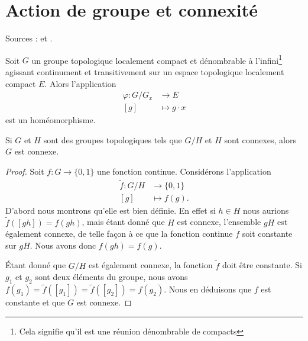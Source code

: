 \section{Action de groupe et connexité}

Sources : \cite{MneimneLie} et .

\begin{theorem}     \label{ThojrLKZk}
    Soit \( G\) un groupe topologique localement compact et dénombrable à l'infini\footnote{Cela signifie qu'il est une réunion dénombrable de compacts} agissant continument et transitivement sur un espace topologique localement compact \( E\). Alors l'application
    \begin{equation}
        \begin{aligned}
            \varphi\colon G/G_x&\to E \\
            [g]&\mapsto g\cdot x 
        \end{aligned}
    \end{equation}
    est un homéomorphisme.
\end{theorem}

\begin{lemma}       \label{LemkLRAet}
    Si \( G\) et \( H\) sont des groupes topologiques tels que $G/H$ et \( H\) sont connexes, alors \( G\) est connexe.
\end{lemma}

\begin{proof}
    Soit \( f\colon G\to \{ 0,1 \}\) une fonction continue. Considérons l'application
    \begin{equation}
        \begin{aligned}
            \tilde f\colon G/H&\to \{ 0,1 \} \\
            [g]&\mapsto f(g). 
        \end{aligned}
    \end{equation}
    D'abord nous montrons qu'elle est bien définie. En effet si \( h\in H\) nous aurions \( \tilde f([gh])=f(gh)\), mais étant donné que \( H\) est connexe, l'ensemble \( gH\) est également connexe, de telle façon à ce que la fonction continue \( f\) soit constante sur \( gH\). Nous avons donc \( f(gh)=f(g)\).

    Étant donné que \( G/H\) est également connexe, la fonction \( \tilde f\) doit être constante. Si \( g_1\) et \( g_2\) sont deux éléments du groupe, nous avons \( f(g_1)=\tilde f([g_1])=\tilde f([g_2])=f(g_2)\). Nous en déduisons que \( f\) est constante et que \( G\) est connexe.
\end{proof}

